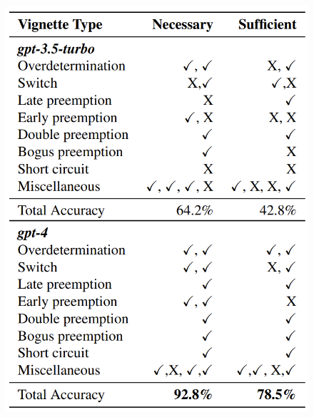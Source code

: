 \documentclass{beamer}
\begin{document}
\begin{frame}
\begin{columns}
\begin{column}{0.5\textwidth}
			\begin{figure}
				\centering
				\includegraphics[scale=0.15]{imgs/table_11_12.png}
			\end{figure}
		\end{column}
	\end{columns}
\end{frame}
\end{document}
